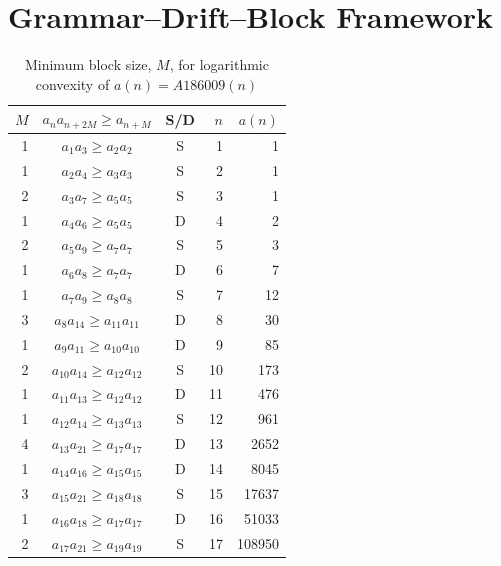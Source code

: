\documentclass[12pt, oneside]{article}
\numberwithin{equation}{section}
\theoremstyle{definition}
\theoremstyle{plain}
\theoremstyle{remark}
\begin{document}

\section{Grammar–Drift–Block Framework}
\label{sec:grammar-drift-block}

\begin{table}[htbp]
\centering
\caption{Minimum block size, $M$, for logarithmic convexity of $a(n) = A186009(n)$}
\label{tab:A186009}
\vspace{4pt}
\begin{tabular}{@{}rccrr@{}}
\toprule
$M$ & $a_{n} a_{n+2M} \ge a_{n+M}$ & {S/D} & $n$ & $a(n)$ \\
\midrule
1 & $a_{ 1} a_{ 3} \ge a_{ 2} a_{ 2}$ & S &  1 &            1 \\
1 & $a_{ 2} a_{ 4} \ge a_{ 3} a_{ 3}$ & S &  2 &            1 \\
2 & $a_{ 3} a_{ 7} \ge a_{ 5} a_{ 5}$ & S &  3 &            1 \\
1 & $a_{ 4} a_{ 6} \ge a_{ 5} a_{ 5}$ & D &  4 &            2 \\
2 & $a_{ 5} a_{ 9} \ge a_{ 7} a_{ 7}$ & S &  5 &            3 \\
1 & $a_{ 6} a_{ 8} \ge a_{ 7} a_{ 7}$ & D &  6 &            7 \\
1 & $a_{ 7} a_{ 9} \ge a_{ 8} a_{ 8}$ & S &  7 &           12 \\
3 & $a_{ 8} a_{14} \ge a_{11} a_{11}$ & D &  8 &           30 \\
1 & $a_{ 9} a_{11} \ge a_{10} a_{10}$ & D &  9 &           85 \\
2 & $a_{10} a_{14} \ge a_{12} a_{12}$ & S & 10 &          173 \\
1 & $a_{11} a_{13} \ge a_{12} a_{12}$ & D & 11 &          476 \\
1 & $a_{12} a_{14} \ge a_{13} a_{13}$ & S & 12 &          961 \\
4 & $a_{13} a_{21} \ge a_{17} a_{17}$ & D & 13 &         2652 \\
1 & $a_{14} a_{16} \ge a_{15} a_{15}$ & D & 14 &         8045 \\
3 & $a_{15} a_{21} \ge a_{18} a_{18}$ & S & 15 &        17637 \\
1 & $a_{16} a_{18} \ge a_{17} a_{17}$ & D & 16 &        51033 \\
2 & $a_{17} a_{21} \ge a_{19} a_{19}$ & S & 17 &       108950 \\

\end{tabular}
\end{table}
\end{document}
